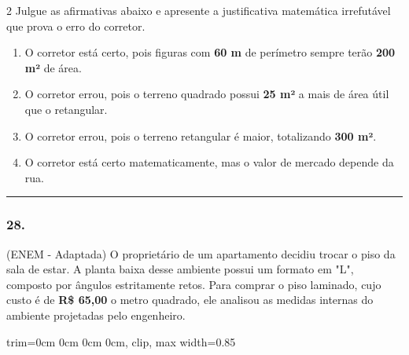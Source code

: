 \documentclass[twoside, 10pt, a4paper]{article}
\newlength{\espacoPreQuestao}\setlength{\espacoPreQuestao}{0.1cm}
\newlength{\espacoQuestao}\setlength{\espacoQuestao}{0.2cm}
\newlength{\espacoAlt}\setlength{\espacoAlt}{0.2cm}
\newcommand{\larguraTikz}{0.85\linewidth}
\begin{document}
\begin{multicols*}{2}
Julgue as afirmativas abaixo e apresente a justificativa matemática irrefutável que prova o erro do corretor.

\begin{enumerate}[label=\alph*), itemsep=\espacoAlt]
\item O corretor está certo, pois figuras com \textbf{60 m} de perímetro sempre terão \textbf{200 m²} de área.
\item O corretor errou, pois o terreno quadrado possui \textbf{25 m²} a mais de área útil que o retangular.
\item O corretor errou, pois o terreno retangular é maior, totalizando \textbf{300 m²}.
\item O corretor está certo matematicamente, mas o valor de mercado depende da rua.
\end{enumerate}
\par\vspace{\espacoQuestao}

\noindent\textcolor{CorLinha}{\rule{\linewidth}{0.5pt}} 
\par\vspace{\espacoPreQuestao}
\subsubsection*{28.} (ENEM - Adaptada) O proprietário de um apartamento decidiu trocar o piso da sala de estar. A planta baixa desse ambiente possui um formato em "L", composto por ângulos estritamente retos. Para comprar o piso laminado, cujo custo é de \textbf{R\$ 65,00} o metro quadrado, ele analisou as medidas internas do ambiente projetadas pelo engenheiro.

\begin{center}
\begin{adjustbox}{trim=0cm 0cm 0cm 0cm, clip, max width=\larguraTikz}
\end{adjustbox}
\end{center}


\end{multicols*}
\end{document}
